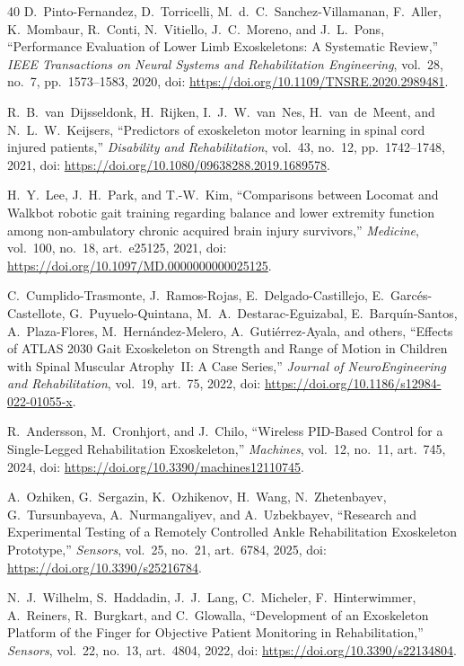 \documentclass[journal]{IEEEtran}
\begin{document}
\begin{thebibliography}{40}
D.~Pinto-Fernandez, D.~Torricelli, M.~d.~C.~Sanchez-Villamanan, F.~Aller, K.~Mombaur, R.~Conti, N.~Vitiello, J.~C.~Moreno, and J.~L.~Pons, ``Performance Evaluation of Lower Limb Exoskeletons: A Systematic Review,'' \emph{IEEE Transactions on Neural Systems and Rehabilitation Engineering}, vol.~28, no.~7, pp.~1573--1583, 2020, doi: \url{https://doi.org/10.1109/TNSRE.2020.2989481}.


R.~B.~van~Dijsseldonk, H.~Rijken, I.~J.~W.~van~Nes, H.~van~de~Meent, and N.~L.~W.~Keijsers, ``Predictors of exoskeleton motor learning in spinal cord injured patients,'' \emph{Disability and Rehabilitation}, vol.~43, no.~12, pp.~1742--1748, 2021, doi: \url{https://doi.org/10.1080/09638288.2019.1689578}.

H.~Y.~Lee, J.~H.~Park, and T.-W.~Kim, ``Comparisons between Locomat and Walkbot robotic gait training regarding balance and lower extremity function among non-ambulatory chronic acquired brain injury survivors,'' \emph{Medicine}, vol.~100, no.~18, art.~e25125, 2021, doi: \url{https://doi.org/10.1097/MD.0000000000025125}.

C.~Cumplido-Trasmonte, J.~Ramos-Rojas, E.~Delgado-Castillejo, E.~Garcés-Castellote, G.~Puyuelo-Quintana, M.~A.~Destarac-Eguizabal, E.~Barquín-Santos, A.~Plaza-Flores, M.~Hernández-Melero, A.~Gutiérrez-Ayala, and others, ``Effects of ATLAS 2030 Gait Exoskeleton on Strength and Range of Motion in Children with Spinal Muscular Atrophy~II: A Case Series,'' \emph{Journal of NeuroEngineering and Rehabilitation}, vol.~19, art.~75, 2022, doi: \url{https://doi.org/10.1186/s12984-022-01055-x}.


R.~Andersson, M.~Cronhjort, and J.~Chilo, ``Wireless PID-Based Control for a Single-Legged Rehabilitation Exoskeleton,'' \emph{Machines}, vol.~12, no.~11, art.~745, 2024, doi: \url{https://doi.org/10.3390/machines12110745}.


A.~Ozhiken, G.~Sergazin, K.~Ozhikenov, H.~Wang, N.~Zhetenbayev, G.~Tursunbayeva, A.~Nurmangaliyev, and A.~Uzbekbayev, ``Research and Experimental Testing of a Remotely Controlled Ankle Rehabilitation Exoskeleton Prototype,'' \emph{Sensors}, vol.~25, no.~21, art.~6784, 2025, doi: \url{https://doi.org/10.3390/s25216784}.


N.~J.~Wilhelm, S.~Haddadin, J.~J.~Lang, C.~Micheler, F.~Hinterwimmer, A.~Reiners, R.~Burgkart, and C.~Glowalla, ``Development of an Exoskeleton Platform of the Finger for Objective Patient Monitoring in Rehabilitation,'' \emph{Sensors}, vol.~22, no.~13, art.~4804, 2022, doi: \url{https://doi.org/10.3390/s22134804}.



\end{thebibliography}
\end{document}
